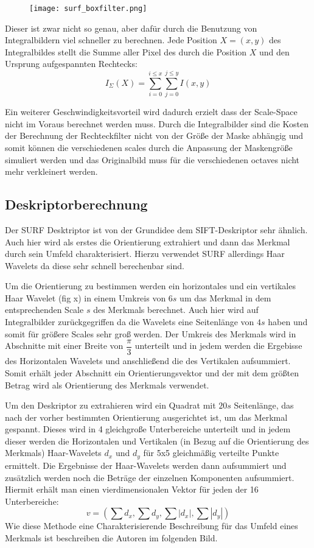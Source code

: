 \begin{figure}[h]
\texttt{[image: surf\_boxfilter.png]}
\centering
\end{figure}

Dieser ist zwar nicht so genau, aber dafür durch die Benutzung von Integralbildern viel schneller zu berechnen.
Jede Position $X=(x, y)$ des Integralbildes stellt die Summe aller Pixel des durch die Position $X$ und den Ursprung aufgespannten Rechtecks:
\begin{equation}
I_\Sigma(X)=\sum_{i=0}^{i\leq x}\sum_{j=0}^{j\leq y}I(x,y)
\end{equation}

Ein weiterer Geschwindigkeitsvorteil wird dadurch erzielt dass der Scale-Space nicht im Voraus berechnet werden muss. Durch die Integralbilder sind die Kosten der Berechnung der Rechteckfilter nicht von der Größe der Maske abhängig und somit können die verschiedenen \Glspl{scale} durch die Anpassung der Maskengröße simuliert werden und das Originalbild muss für die verschiedenen \Glspl{octave} nicht mehr verkleinert werden.

\subsection{Deskriptorberechnung}

Der SURF Desktriptor ist von der Grundidee dem SIFT-Deskriptor sehr ähnlich.
Auch hier wird als erstes die Orientierung extrahiert und dann das Merkmal durch sein Umfeld charakterisiert.
Hierzu verwendet SURF allerdings Haar Wavelets da diese sehr schnell berechenbar sind.

Um die Orientierung zu bestimmen werden ein horizontales und ein vertikales Haar Wavelet (fig x) in einem Umkreis von $6s$ um das Merkmal in dem entsprechenden Scale $s$ des Merkmals berechnet.
Auch hier wird auf Integralbilder zurückgegriffen da die Wavelets eine Seitenlänge von $4s$ haben und somit für größere Scales sehr groß werden.
Der Umkreis des Merkmals wird in Abschnitte mit einer Breite von $\dfrac{\pi}{3}$ unterteilt und in jedem werden die Ergebisse des Horizontalen Wavelets und anschließend die des Vertikalen aufsummiert.
Somit erhält jeder Abschnitt ein Orientierungsvektor und der mit dem größten Betrag wird als Orientierung des Merkmals verwendet.

Um den Deskriptor zu extrahieren wird ein Quadrat mit $20s$ Seitenlänge, das nach der vorher bestimmten Orientierung ausgerichtet ist, um das Merkmal gespannt.
Dieses wird in 4 gleichgroße Unterbereiche unterteilt und in jedem dieser werden die Horizontalen und Vertikalen (in Bezug auf die Orientierung des Merkmals) Haar-Wavelets $d_x$ und $d_y$ für 5x5 gleichmäßig verteilte Punkte ermittelt. 
Die Ergebnisse der Haar-Wavelets werden dann aufsummiert und zusätzlich werden noch die Beträge der einzelnen Komponenten aufsummiert.
Hiermit erhält man einen vierdimensionalen Vektor für jeden der 16 Unterbereiche:
\begin{equation}
v=(\sum d_x, \sum d_y, \sum |d_x|, \sum |d_y|)
\end{equation}
Wie diese Methode eine Charakterisierende Beschreibung für das Umfeld eines Merkmals ist beschreiben die Autoren im folgenden Bild.

